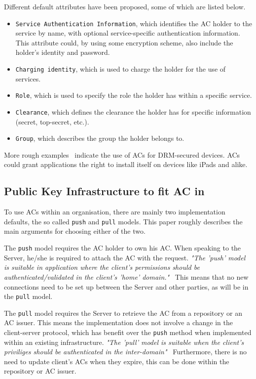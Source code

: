 \documentclass[10pt,conference,a4paper]{IEEEtran}
\begin{document}
Different default attributes have been proposed, some of which are listed below.~\cite{benantar2006access,rfc_ac}
\begin{itemize}
	\item \texttt{Service Authentication Information}, which identifies the AC holder to the service by name, with optional service-specific authentication information. This attribute could, by using some encryption scheme, also include the holder's identity and password.
	\item \texttt{Charging identity}, which is used to charge the holder for the use of services.
	\item \texttt{Role}, which is used to specify the role the holder has within a specific service.
	\item \texttt{Clearance}, which defines the clearance the holder has for specific information (secret, top-secret, etc.).
	\item \texttt{Group}, which describes the group the holder belongs to.
\end{itemize}

More rough examples~\cite{tilborg2011encyclopedia} indicate the use of ACs for DRM-secured devices. ACs could grant applications the right to install itself on devices like iPads and alike.

\subsection{Public Key Infrastructure to fit AC in}
To use ACs within an organisation, there are mainly two implementation defaults, the so called \texttt{push} and \texttt{pull} models. This paper roughly describes the main arguments for choosing either of the two.

The \texttt{push} model requires the AC holder to own his AC. When speaking to the Server, he/she is required to attach the AC with the request. \textit{"The 'push' model is suitable in application where the client's permissions should be authenticated/validated in the client's 'home' domain."}~\cite{godavari2001secure} This means that no new connections need to be set up between the Server and other parties, as will be in the \texttt{pull} model.

The \texttt{pull} model requires the Server to retrieve the AC from a repository or an AC issuer. This means the implementation does not involve a change in the client-server protocol, which has benefit over the \texttt{push} method when implemented within an existing infrastructure. \textit{"The 'pull' model is suitable when the client's priviliges should be authenticated in the inter-domain"}~\cite{godavari2001secure} Furthermore, there is no need to update client's ACs when they expire, this can be done within the repository or AC issuer.
\end{document}
